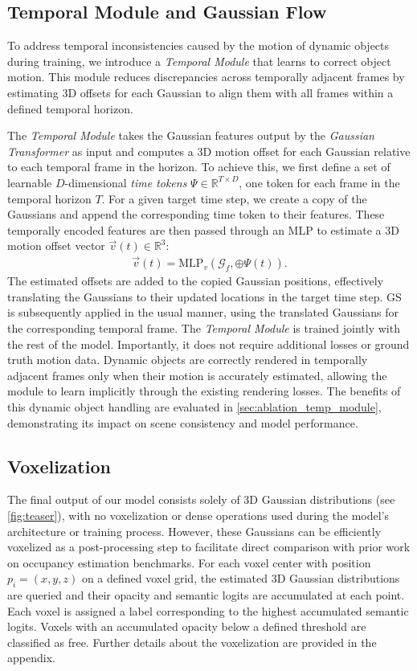 \documentclass[10pt,twocolumn,letterpaper]{article}
\begin{document}
\subsection{Temporal Module and Gaussian Flow} \label{sec:gaussian_flow}
To address temporal inconsistencies caused by the motion of dynamic objects during training, we introduce a \emph{Temporal Module} that learns to correct object motion.
This module reduces discrepancies across temporally adjacent frames by estimating 3D offsets for each Gaussian to align them with all frames within a defined temporal horizon.

The \emph{Temporal Module} takes the Gaussian features output by the \emph{Gaussian Transformer} as input and computes a 3D motion offset for each Gaussian relative to each temporal frame in the horizon.
To achieve this, we first define a set of learnable $D$-dimensional \textit{time tokens} $\Psi \in \mathbb{R}^{T \times D}$, one token for each frame in the temporal horizon $T$.
For a given target time step, we create a copy of the Gaussians and append the corresponding time token to their features.
These temporally encoded features are then passed through an MLP to estimate a 3D motion offset vector $\overrightarrow{v} (t) \in \mathbb{R}^3$:
 \begin{align}
    \overrightarrow{v} (t) = \mathrm{MLP}_v  \left(\mathcal{G}_f, \oplus  \Psi(t) \right).
\end{align}
The estimated offsets are added to the copied Gaussian positions, effectively translating the Gaussians to their updated locations in the target time step.
GS is subsequently applied in the usual manner, using the translated Gaussians for the corresponding temporal frame.
The \emph{Temporal Module} is trained jointly with the rest of the model.
Importantly, it does not require additional losses or ground truth motion data.
Dynamic objects are correctly rendered in temporally adjacent frames only when their motion is accurately estimated, allowing the module to learn implicitly through the existing rendering losses.
The benefits of this dynamic object handling are evaluated in \cref{sec:ablation_temp_module}, demonstrating its impact on scene consistency and model performance.

\subsection{Voxelization} \label{sec:voxelize}
The final output of our model consists solely of 3D Gaussian distributions (see \cref{fig:teaser}), with no voxelization or dense operations used during the model’s architecture or training process.
However, these Gaussians can be efficiently voxelized as a post-processing step to facilitate direct comparison with prior work on occupancy estimation benchmarks.
For each voxel center with position $p_i=(x,y,z)$ on a defined voxel grid, the estimated 3D Gaussian distributions are queried and their opacity and semantic logits are accumulated at each point.
Each voxel is assigned a label corresponding to the highest accumulated semantic logits.
Voxels with an accumulated opacity below a defined threshold are classified as free.
Further details about the voxelization are provided in the appendix.
\end{document}
